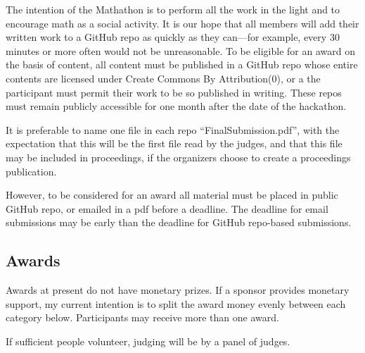 \documentclass[11pt]{article}
\begin{document}
The intention of the Mathathon is to perform all the work in the light and to encourage math
as a social activity.
It is our hope that all members will add their written work to a GitHub repo as quickly
as they can---for example, every 30 minutes or more often would not be unreasonable.
To be eligible for an award on the basis of content, all content must be published in a GitHub repo
whose entire contents are licensed under Create Commons By Attribution(0), or a the
participant must permit their work to be so published in writing.
These repos must remain publicly accessible for one month after the date of the hackathon.

It is preferable to name one file in each repo ``FinalSubmission.pdf'', with the expectation that this
will be the first file read by the judges, and that this file may be included in proceedings, if the
organizers choose to create a proceedings publication.

However, to be considered for an
award all material must be placed in public GitHub repo, or emailed in a pdf before a deadline.
The deadline for email submissions may be early than the deadline for GitHub repo-based submissions.

\subsection{Awards}

Awards at present do not have monetary prizes. If a sponsor provides monetary support, my current intention is to split
the award money evenly between each category below. Participants may receive more than one award.

If sufficient people volunteer, judging will be by a panel of judges.
\end{document}
